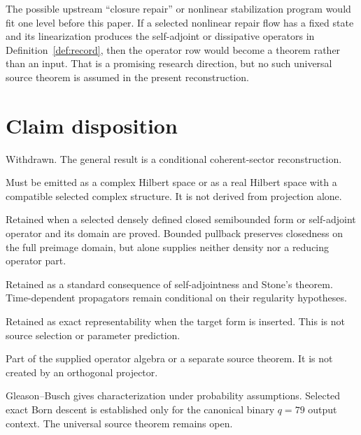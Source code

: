\documentclass[11pt]{article}
\theoremstyle{definition}
\theoremstyle{remark}
\let\MTToriginalitem\item
\renewcommand{\item}{\par\MTToriginalitem}
\begin{document}
The possible upstream ``closure repair'' or nonlinear stabilization program
would fit one level before this paper.  If a selected nonlinear repair flow
has a fixed state and its linearization produces the self-adjoint or
dissipative operators in Definition~\ref{def:record}, then the operator row would
become a theorem rather than an input.  That is a promising research
direction, but no such universal source theorem is assumed in the present
reconstruction.

\section{Claim disposition}
\label{sec:claims}

\begin{description}[leftmargin=3.3cm,style=nextline]
\item[Complete derivation]
Withdrawn.  The general result is a conditional coherent-sector
reconstruction.

\item[Hilbert structure]
Must be emitted as a complex Hilbert space or as a real Hilbert space with a
compatible selected complex structure.  It is not derived from projection
alone.

\item[Self-adjoint Hamiltonian]
Retained when a selected densely defined closed semibounded form or
self-adjoint operator and its domain are proved. Bounded pullback preserves
closedness on the full preimage domain, but alone supplies neither density
nor a reducing operator part.

\item[Unitary dynamics]
Retained as a standard consequence of self-adjointness and Stone's theorem.
Time-dependent propagators remain conditional on their regularity
hypotheses.

\item[Arbitrary Schrodinger models]
Retained as exact representability when the target form is inserted.  This
is not source selection or parameter prediction.

\item[Noncommutativity]
Part of the supplied operator algebra or a separate source theorem.  It is
not created by an orthogonal projector.

\item[Born rule]
Gleason--Busch gives characterization under probability assumptions.
Selected exact Born descent is established only for the canonical binary
\(q=79\) output context.  The universal source theorem remains open.


\end{description}
\end{document}
